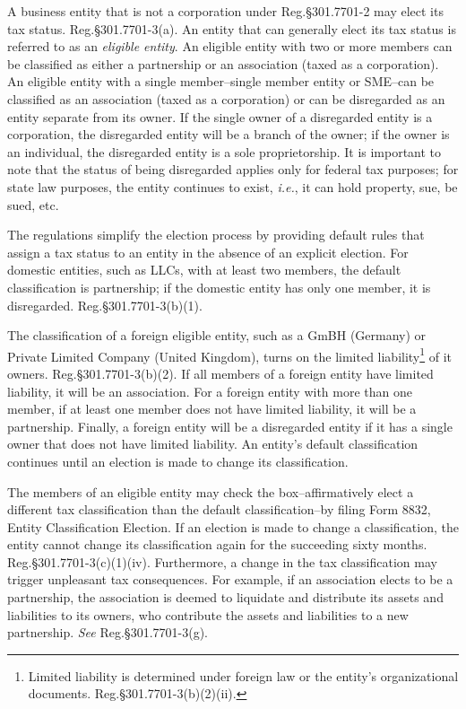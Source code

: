 A business entity  that is not a corporation under Reg.\@ \S301.7701-2 may elect its tax status.  Reg.\@ \S301.7701-3(a).  An entity that can generally elect its tax status is referred to as an \emph{eligible entity}.  An eligible entity with two or more members can be classified as either a partnership or an association (taxed as a corporation).  An eligible entity with a single member--single member entity or SME--can be classified as an association (taxed as a corporation) or can be disregarded as an entity separate from its owner.  If the single owner of a disregarded entity is a corporation, the disregarded entity will be a branch of the owner; if the owner is an individual, the disregarded entity is a sole proprietorship.  It is important to note that the status of being disregarded applies only for federal tax purposes; for state law purposes, the entity continues to exist, \textit{i.e.}, it can hold property, sue, be sued, etc.

The regulations simplify the election process by providing default rules that assign a tax status to an entity in the absence of an explicit election.    For domestic entities, such as LLCs, with at least two members, the default classification is partnership; if the domestic entity has only one member, it is disregarded.  Reg.\@ \S301.7701-3(b)(1).   

The classification of a foreign eligible entity, such as a GmBH (Germany) or Private Limited Company (United Kingdom), turns on the limited liability\footnote{Limited liability is determined under foreign law or the entity's organizational documents.  Reg.\@ \S301.7701-3(b)(2)(ii).} of it owners.   Reg.\@ \S301.7701-3(b)(2). If all members of a foreign entity have limited liability, it will be an association.  For a foreign entity with more than one member, if at least one member does not have limited liability, it will be a partnership.  Finally, a foreign entity will be a disregarded entity if it has a single owner that does not have limited liability.  An entity's default classification continues until an election is made to change its classification.

The members of an eligible entity may check the box--affirmatively elect a different tax classification than the default classification--by filing Form 8832, Entity Classification Election.  If an election is made to change a classification, the entity cannot change its classification again for the succeeding sixty months.  Reg.\@ \S301.7701-3(c)(1)(iv).  Furthermore, a change in the tax classification may trigger unpleasant tax consequences. For example, if an association elects to be a partnership, the association is deemed to liquidate and distribute its assets and liabilities to its owners, who contribute the assets and liabilities to a new partnership.  \emph{See} Reg.\@ \S301.7701-3(g).

